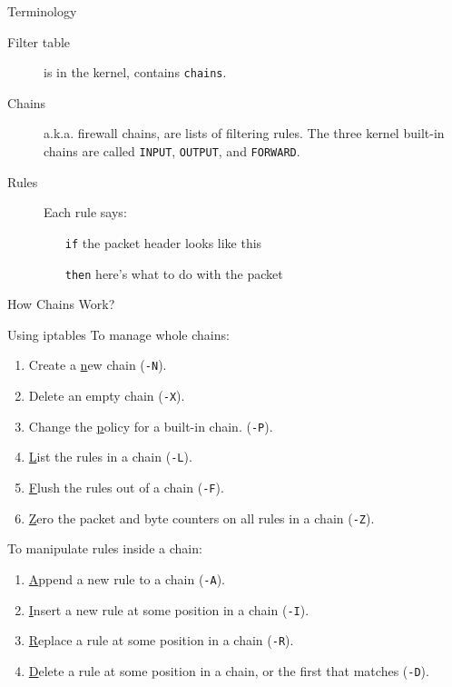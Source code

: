 \begin{frame}{Terminology}
  \begin{description}
  \item[Filter table] is in the kernel, contains \texttt{chains}.
  \item[Chains] a.k.a. firewall chains, are lists of filtering rules. The three kernel
    built-in chains are called \texttt{INPUT}, \texttt{OUTPUT}, and \texttt{FORWARD}.
  \item[Rules] Each rule says:
    \begin{itemize}
    \item[\texttt{if}] the packet header looks like this
    \item[\texttt{then}] here's what to do with the packet
    \end{itemize}
  \end{description}
\end{frame}

\begin{frame}{How Chains Work?}
  \begin{center}
  \end{center}
\end{frame}

\begin{frame}{Using iptables}
  To manage whole chains:
  \begin{enumerate}
  \item Create a \underline{n}ew chain (\texttt{-N}).
  \item Delete an empty chain (\texttt{-X}).
  \item Change the \underline{p}olicy for a built-in chain. (\texttt{-P}).
  \item \underline{L}ist the rules in a chain (\texttt{-L}).
  \item \underline{F}lush the rules out of a chain (\texttt{-F}).
  \item \underline{Z}ero the packet and byte counters on all rules in a chain (\texttt{-Z}).
  \end{enumerate}
  To manipulate rules inside a chain:
  \begin{enumerate}
  \item \underline{A}ppend a new rule to a chain (\texttt{-A}).
  \item \underline{I}nsert a new rule at some position in a chain (\texttt{-I}).
  \item \underline{R}eplace a rule at some position in a chain (\texttt{-R}).
  \item \underline{D}elete a rule at some position in a chain, or the first that matches
    (\texttt{-D}).
  \end{enumerate}
\end{frame}

